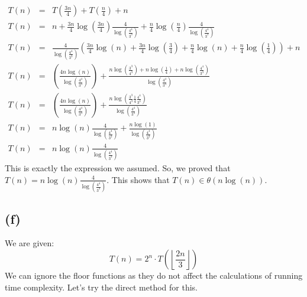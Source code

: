\documentclass[a4paper,12pt]{article} %
\begin{document}
\begin{eqnarray*}
    T(n) &=& T\left(\frac{3n}{4}\right) + T\left(\frac{n}{4}\right) + n\\
    T(n) &=& n + \frac{3n}{4}\log\left(\frac{3n}{4}\right)\frac{4}{\log\left(\frac{4^4}{3^3}\right)} + \frac{n}{4}\log\left(\frac{n}{4}\right)\frac{4}{\log\left(\frac{4^4}{3^3}\right)}\\
    T(n) &=& \frac{4}{\log\left(\frac{4^4}{3^3}\right)} \left(\frac{3n}{4}\log(n) + \frac{3n}{4}\log\left(\frac{3}{4}\right) + \frac{n}{4}\log(n) + \frac{n}{4}\log\left(\frac{1}{4}\right)\right) + n\\
    T(n) &=& \left(\frac{4n\log(n)}{\log\left(\frac{4^4}{3^3}\right)}\right) + \frac{n\log\left(\frac{3^3}{4^3}\right) + n\log\left(\frac{1}{4}\right) + n\log\left(\frac{4^4}{3^3}\right)}{\log\left(\frac{4^4}{3^3}\right)}\\
    T(n) &=& \left(\frac{4n\log(n)}{\log\left(\frac{4^4}{3^3}\right)}\right) + \frac{n\log\left(\frac{3^3}{4^3}\frac{1}{4}\frac{4^4}{3^3}\right)}{\log\left(\frac{4^4}{3^3}\right)}\\
    T(n) &=& n\log(n)\frac{4}{\log\left(\frac{4^4}{3^3}\right)} + \frac{n\log(1)}{\log\left(\frac{4^4}{3^3}\right)}\\
    T(n) &=& n\log(n)\frac{4}{\log\left(\frac{4^4}{3^3}\right)}
\end{eqnarray*}
This is exactly the expression we assumed. So, we proved that $T(n) = n\log(n)\frac{4}{\log\left(\frac{4^4}{3^3}\right)}$. This shows that $T(n) \in \theta(n\log(n))$.


\subsection*{(f)}
We are given:
\begin{equation*}
    T(n) = 2^n \cdot T\left(\left \lfloor \frac{2n}{3} \right \rfloor \right)
\end{equation*}
We can ignore the floor functions as they do not affect the calculations of running time complexity. Let's try the direct method for this.
\end{document}
